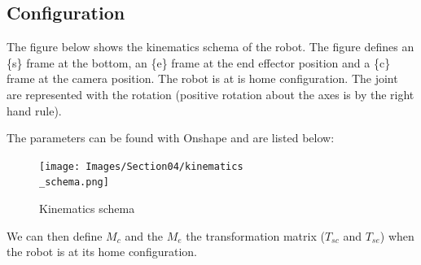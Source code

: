 \subsection{Configuration}

\bigbreak
The figure below shows the kinematics schema of the robot. The figure defines an \{s\} frame at the bottom, an \{e\} frame at the end effector position and a \{c\} frame at the camera position. The robot is at is home configuration. The joint are represented with the rotation (positive rotation about the axes is by the right hand rule).

\bigbreak 
The parameters can be found with Onshape and are listed below: 

\begin{center}
\end{center}

\begin{figure}[ht]
    \centering
    \texttt{[image: Images/Section04/kinematics\\\_schema.png]}
    \caption{Kinematics schema}
    \label{fig:kinematicsSchema}
\end{figure}
\FloatBarrier

\bigbreak
We can then define $M_c$ and the $M_e$ the transformation matrix ($T_{sc}$ and $T_{se}$) when the robot is at its home configuration. 

